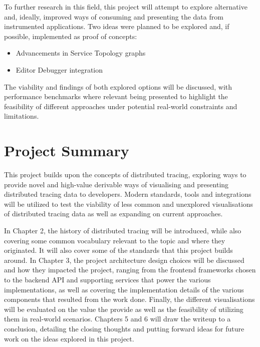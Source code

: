 \documentclass[12pt,pdftex,titlepage]{report}
\begin{document}
            To further research in this field, this project will attempt to explore alternative and, ideally, improved ways of consuming and presenting the data from instrumented
            applications. Two ideas were planned to be explored and, if possible, implemented as proof of concepts:

            \begin{itemize}
                \item Advancements in Service Topology graphs
                \item Editor Debugger integration                
            \end{itemize}

            The viability and findings of both explored options will be discussed, with performance benchmarks where relevant being presented to highlight the feasibility of different
            approaches under potential real-world constraints and limitations.

        \section{Project Summary}
            This project builds upon the concepts of distributed tracing, exploring ways to provide novel and high-value derivable ways of visualising and presenting distributed tracing
            data to developers. Modern standards, tools and integrations will be utilized to test the viability of less common and unexplored visualisations of distributed tracing data
            as well as expanding on current approaches.

            In Chapter 2, the history of distributed tracing will be introduced, while also covering some common vocabulary relevant to the topic and where they originated. It will also
            cover some of the standards that this project builds around. In Chapter 3, the project architecture design choices will be discussed and how they impacted the project, ranging
            from the frontend frameworks chosen to the backend API and supporting services that power the various implementations, as well as covering the implementation details of the various
            components that resulted from the work done. Finally, the different visualisations will be evaluated on the value the provide as well as the feasibility of utilizing them in real-world
            scenarios. Chapters 5 and 6 will draw the writeup to a conclusion, detailing the closing thoughts and putting forward ideas for future work on the ideas explored in this project.
\end{document}
